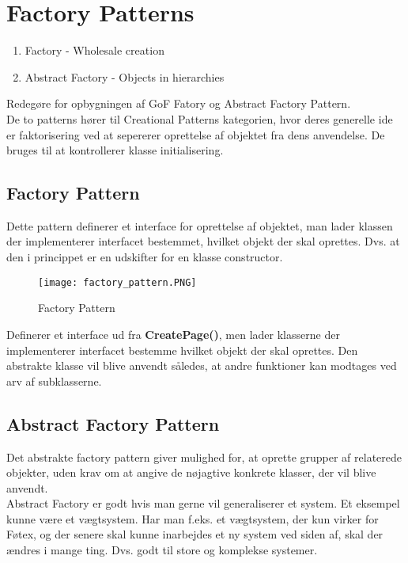 \documentclass[../SWD_disp.tex]{subfiles}
\begin{document}
\section{Factory Patterns}
\begin{enumerate}
    \item Factory - Wholesale creation
    \item Abstract Factory - Objects in hierarchies
\end{enumerate}

Redegøre for opbygningen af GoF Fatory og Abstract Factory Pattern.
\\

De to patterns hører til Creational Patterns kategorien, hvor deres generelle ide er faktorisering ved at sepererer oprettelse af objektet fra dens anvendelse. De bruges til at kontrollerer klasse initialisering.

\subsection*{Factory Pattern}
Dette pattern definerer et interface for oprettelse af objektet, man lader klassen der implementerer interfacet bestemmet, hvilket objekt der skal oprettes. Dvs. at den i princippet er en udskifter for en klasse constructor.

\begin{figure}[H]
    \centering
    \texttt{[image: factory\_pattern.PNG]}
    \caption{Factory Pattern}
    \label{fig:factory_pattern}
\end{figure}

Definerer et interface ud fra \textbf{CreatePage()}, men lader klasserne der implementerer interfacet bestemme hvilket objekt der skal oprettes. Den abstrakte klasse vil blive anvendt således, at andre funktioner kan modtages ved arv af subklasserne.

\subsection*{Abstract Factory Pattern}
Det abstrakte factory pattern giver mulighed for, at oprette grupper af relaterede objekter, uden krav om at angive de nøjagtive konkrete klasser, der vil blive anvendt.
\\

Abstract Factory er godt hvis man gerne vil generaliserer et system. Et eksempel kunne være et vægtsystem. Har man f.eks. et vægtsystem, der kun virker for Føtex, og der senere skal kunne inarbejdes et ny system ved siden af, skal der ændres i mange ting. Dvs. godt til store og komplekse systemer.
\end{document}
